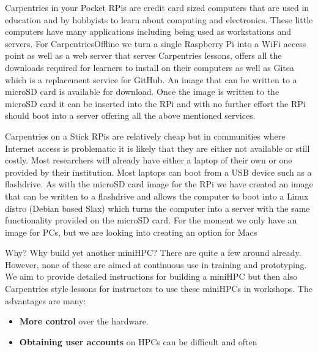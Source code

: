 \documentclass[final]{beamer}
\newlength{\colwidth}
\begin{document}
\begin{frame}[t]
\begin{columns}[t]
\begin{column}{\colwidth}
\begin{alertblock}{Carpentries in your Pocket}
					RPis are credit card sized computers that are used in education and by hobbyists to learn about computing and electronics. 
					These little computers have many applications including being used as workstations and servers. For CarpentriesOffline we turn a single 
					Raspberry Pi into a WiFi access point as well as a web server that serves Carpentries lessons, offers all the downloads required for 
					learners to install on their computers as well as Gitea which is a replacement service for GitHub. An image that can be written to 
					a microSD card is available for download. Once the image is written to the microSD card it can be inserted into the RPi and with no 
					further effort the RPi should boot into a server offering all the above mentioned services.					
					\break
					\break
					\break
					\break
					\break
					\break
					\break
					\break
					\break
					\break
				\end{alertblock}		
				\begin{alertblock}{Carpentries on a Stick}			
					RPis are relatively cheap but in communities where Internet access is problematic it is likely that they are either not available or still 
					costly. Most researchers will already have either a laptop of their own or one provided by their institution. Most laptops can boot from 
					a USB device such as a flashdrive. As with the microSD card image for the RPi we have created an image that can be written to a flashdrive 
					and allows the computer to boot into a Linux distro (Debian based Slax) which turns the computer into a server with the same functionality 
					provided on the microSD card. For the moment we only have an image for PCs, but we are looking into creating an option for Macs
					\break
					\break
					\break
					\break
					\break
					\break
					\break
					\break
					\break
					\break
				\end{alertblock}
				\begin{alertblock}{Why?}
					Why build yet another miniHPC? There are quite a few around already. However, none of these 
					are aimed at continuous use in training and prototyping. We aim to provide detailed instructions
					for building a miniHPC but then also Carpentries style lessons for instructors to use these 
					miniHPCs in workshops. The advantages are many:
					\begin{itemize}
						\item \textbf{More control} over the hardware.
						\item \textbf{Obtaining user accounts} on HPCs can be difficult and often

\end{itemize}
\end{alertblock}
\end{column}
\end{columns}
\end{frame}
\end{document}
